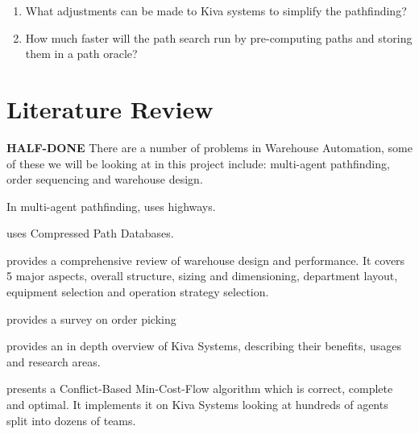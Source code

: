 \documentclass[a4paper,11pt]{article}
\begin{document}
\begin{enumerate}
	\item What adjustments can be made to Kiva systems to simplify the pathfinding?

\item How much faster will the path search run by pre-computing paths and storing them in a path oracle?

\end{enumerate}

\section{Literature Review}
\textbf{HALF-DONE} There are a number of problems in Warehouse Automation, some of these we will be looking at in this project include: multi-agent pathfinding, order sequencing and warehouse design.

In multi-agent pathfinding, \cite{cohen2016bounded} uses highways.

\cite{strasser2015compressing} uses Compressed Path Databases.

\cite{gu2010research} provides a comprehensive review of warehouse design and performance. It covers 5 major aspects, overall structure, sizing and dimensioning, department layout, equipment selection and operation strategy selection.

\cite{de2007design} provides a survey on order picking

\cite{wurman2008coordinating} provides an in depth overview of Kiva Systems, describing their benefits, usages and research areas.




\cite{ma2016optimal} presents a Conflict-Based Min-Cost-Flow algorithm which is correct, complete and optimal. It implements it on Kiva Systems looking at hundreds of agents split into dozens of teams.





\end{document}
